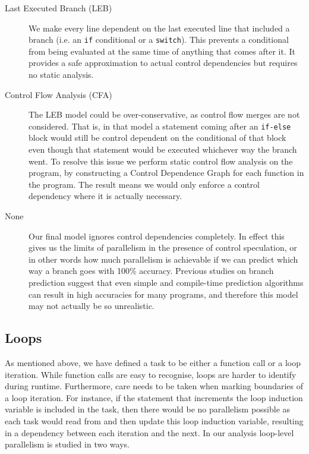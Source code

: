 \begin{description}

\item[Last Executed Branch (LEB)]
We make every line dependent on the last executed line that included a branch (i.e. an \texttt{if} conditional or a \texttt{switch}).
This prevents a conditional from being evaluated at the same time of anything that comes after it.
It provides a safe approximation to actual control dependencies but requires no static analysis.

\item[Control Flow Analysis (CFA)]
The LEB model could be over-conservative, as control flow merges are not considered.
That is, in that model a statement coming after an \texttt{if-else} block would still be control dependent on the conditional of that block even though that statement would be executed whichever way the branch went.
To resolve this issue we perform static control flow analysis on the program, by constructing a Control Dependence Graph \cite{ferrante87program} for each function in the program.
The result means we would only enforce a control dependency where it is actually necessary.

\item[None]
Our final model ignores control dependencies completely.
In effect this gives us the limits of parallelism in the presence of control speculation, or in other words how much parallelism is achievable if we can predict which way a branch goes with 100\% accuracy.
Previous studies on branch prediction \cite{smith98study} suggest that even simple and compile-time prediction algorithms can result in high accuracies for many programs, and therefore this model may not actually be so unrealistic.

\end{description}

\subsection{Loops}
As mentioned above, we have defined a task to be either a function call or a loop iteration.
While function calls are easy to recognise, loops are harder to identify during runtime.
Furthermore, care needs to be taken when marking boundaries of a loop iteration.
For instance, if the statement that increments the loop induction variable is included in the task, then there would be no parallelism possible as each task would read from and then update this loop induction variable, resulting in a dependency between each iteration and the next.
In our analysis loop-level parallelism is studied in two ways.

